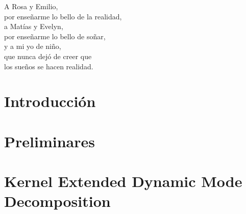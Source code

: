 \documentclass[
	spanish, %
	letterpaper, oneside
]{book}
\begin{document}
\templatePortrait

\templatePagecfg

\begin{abstractd}
	
\end{abstractd}

\begin{dedicatory}
    A Rosa y Emilio, \\
    por enseñarme lo bello de la realidad,\\
    a Matías y Evelyn, \\
    por enseñarme lo bello de soñar,\\
    y a mi yo de niño,\\
    que nunca dejó de creer que\\
    los sueños se hacen realidad.

\end{dedicatory}

\begin{acknowledgments}
	
\end{acknowledgments}

\templateIndex

\templateFinalcfg


\chapter{Introducción}


\chapter{Preliminares}


\chapter{Kernel Extended Dynamic Mode Decomposition}


\end{document}
